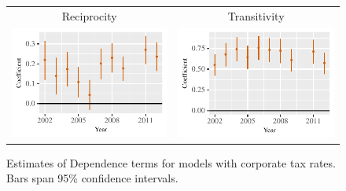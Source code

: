\documentclass[reqno,onecolumn,letterpaper,12pt]{article}
\begin{document}
{\begin{figure}[!h]
\centering
\begin{tabular}{c@{\hskip 0cm}c}
Reciprocity & Transitivity \\
\includegraphics[height=.2\textheight, clip=true, trim=0cm 0cm 0cm .2cm]{draft_figures/rl_plots_xr/Mutuality.pdf}    &
\includegraphics[height=.2\textheight, clip=true, trim=0cm 0cm 0cm .2cm]{draft_figures/rl_plots_xr/Transitivity.pdf}
\end{tabular}
\caption{\label{fig:tax_rates_netterms} Estimates of Dependence terms for models with corporate tax rates. Bars span 95\% confidence intervals. }
\end{figure}

}
\end{document}
